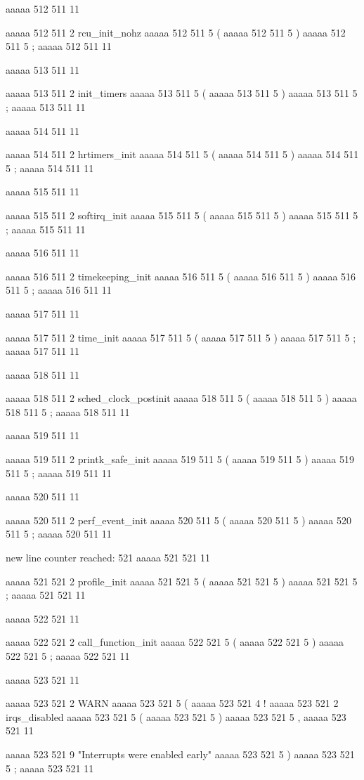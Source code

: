 {aaaaa 512 511
11
	
aaaaa 512 511
2
rcu_init_nohz
aaaaa 512 511
5
(
aaaaa 512 511
5
)
aaaaa 512 511
5
;
aaaaa 512 511
11


aaaaa 513 511
11
	
aaaaa 513 511
2
init_timers
aaaaa 513 511
5
(
aaaaa 513 511
5
)
aaaaa 513 511
5
;
aaaaa 513 511
11


aaaaa 514 511
11
	
aaaaa 514 511
2
hrtimers_init
aaaaa 514 511
5
(
aaaaa 514 511
5
)
aaaaa 514 511
5
;
aaaaa 514 511
11


aaaaa 515 511
11
	
aaaaa 515 511
2
softirq_init
aaaaa 515 511
5
(
aaaaa 515 511
5
)
aaaaa 515 511
5
;
aaaaa 515 511
11


aaaaa 516 511
11
	
aaaaa 516 511
2
timekeeping_init
aaaaa 516 511
5
(
aaaaa 516 511
5
)
aaaaa 516 511
5
;
aaaaa 516 511
11


aaaaa 517 511
11
	
aaaaa 517 511
2
time_init
aaaaa 517 511
5
(
aaaaa 517 511
5
)
aaaaa 517 511
5
;
aaaaa 517 511
11


aaaaa 518 511
11
	
aaaaa 518 511
2
sched_clock_postinit
aaaaa 518 511
5
(
aaaaa 518 511
5
)
aaaaa 518 511
5
;
aaaaa 518 511
11


aaaaa 519 511
11
	
aaaaa 519 511
2
printk_safe_init
aaaaa 519 511
5
(
aaaaa 519 511
5
)
aaaaa 519 511
5
;
aaaaa 519 511
11


aaaaa 520 511
11
	
aaaaa 520 511
2
perf_event_init
aaaaa 520 511
5
(
aaaaa 520 511
5
)
aaaaa 520 511
5
;
aaaaa 520 511
11


new line counter reached: 521
aaaaa 521 521
11
	
aaaaa 521 521
2
profile_init
aaaaa 521 521
5
(
aaaaa 521 521
5
)
aaaaa 521 521
5
;
aaaaa 521 521
11


aaaaa 522 521
11
	
aaaaa 522 521
2
call_function_init
aaaaa 522 521
5
(
aaaaa 522 521
5
)
aaaaa 522 521
5
;
aaaaa 522 521
11


aaaaa 523 521
11
	
aaaaa 523 521
2
WARN
aaaaa 523 521
5
(
aaaaa 523 521
4
!
aaaaa 523 521
2
irqs_disabled
aaaaa 523 521
5
(
aaaaa 523 521
5
)
aaaaa 523 521
5
,
aaaaa 523 521
11
 
aaaaa 523 521
9
"Interrupts were enabled early\n"
aaaaa 523 521
5
)
aaaaa 523 521
5
;
aaaaa 523 521
11


}
